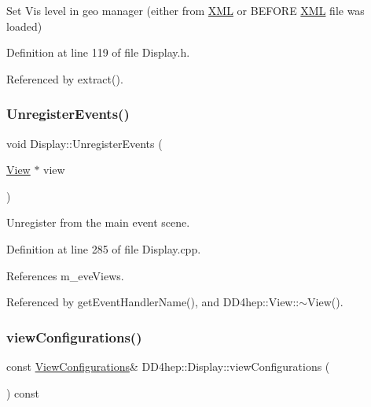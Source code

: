 Set Vis level in geo manager (either from \hyperlink{namespace_d_d4hep_1_1_x_m_l}{X\+ML} or B\+E\+F\+O\+RE \hyperlink{namespace_d_d4hep_1_1_x_m_l}{X\+ML} file was loaded) 



Definition at line 119 of file Display.\+h.



Referenced by extract().

\hypertarget{class_d_d4hep_1_1_display_ab681bf3f69e91271a5c8ec36fb991207}{}\label{class_d_d4hep_1_1_display_ab681bf3f69e91271a5c8ec36fb991207} 
\subsubsection{\texorpdfstring{Unregister\+Events()}{UnregisterEvents()}}
{\footnotesize\ttfamily void Display\+::\+Unregister\+Events (\begin{DoxyParamCaption}\item[{\hyperlink{class_d_d4hep_1_1_view}{View} $\ast$}]{view }\end{DoxyParamCaption})\hspace{0.3cm}{\ttfamily [virtual]}}



Unregister from the main event scene. 



Definition at line 285 of file Display.\+cpp.



References m\+\_\+eve\+Views.



Referenced by get\+Event\+Handler\+Name(), and D\+D4hep\+::\+View\+::$\sim$\+View().

\hypertarget{class_d_d4hep_1_1_display_a7c390acfafb0d019021f2e0aaa7ff828}{}\label{class_d_d4hep_1_1_display_a7c390acfafb0d019021f2e0aaa7ff828} 
\subsubsection{\texorpdfstring{view\+Configurations()}{viewConfigurations()}}
{\footnotesize\ttfamily const \hyperlink{class_d_d4hep_1_1_display_a1bb7fbc1eeb22ef2b1cea35c78e9d27a}{View\+Configurations}\& D\+D4hep\+::\+Display\+::view\+Configurations (\begin{DoxyParamCaption}{ }\end{DoxyParamCaption}) const\hspace{0.3cm}{\ttfamily [inline]}}



